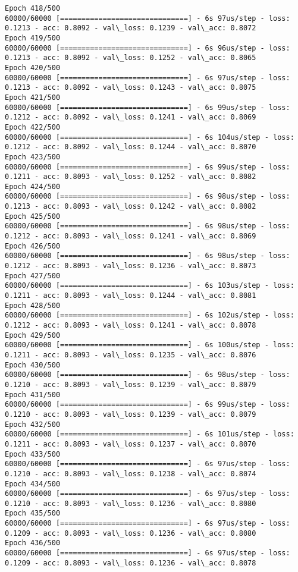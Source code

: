 \documentclass[11pt]{article}
\begin{document}
\begin{Verbatim}[commandchars=\\\{\}]
Epoch 418/500
60000/60000 [==============================] - 6s 97us/step - loss: 0.1213 - acc: 0.8092 - val\_loss: 0.1239 - val\_acc: 0.8072
Epoch 419/500
60000/60000 [==============================] - 6s 96us/step - loss: 0.1213 - acc: 0.8092 - val\_loss: 0.1252 - val\_acc: 0.8065
Epoch 420/500
60000/60000 [==============================] - 6s 97us/step - loss: 0.1213 - acc: 0.8092 - val\_loss: 0.1243 - val\_acc: 0.8075
Epoch 421/500
60000/60000 [==============================] - 6s 99us/step - loss: 0.1212 - acc: 0.8092 - val\_loss: 0.1241 - val\_acc: 0.8069
Epoch 422/500
60000/60000 [==============================] - 6s 104us/step - loss: 0.1212 - acc: 0.8092 - val\_loss: 0.1244 - val\_acc: 0.8070
Epoch 423/500
60000/60000 [==============================] - 6s 99us/step - loss: 0.1211 - acc: 0.8093 - val\_loss: 0.1252 - val\_acc: 0.8082
Epoch 424/500
60000/60000 [==============================] - 6s 98us/step - loss: 0.1213 - acc: 0.8093 - val\_loss: 0.1242 - val\_acc: 0.8082
Epoch 425/500
60000/60000 [==============================] - 6s 98us/step - loss: 0.1212 - acc: 0.8093 - val\_loss: 0.1241 - val\_acc: 0.8069
Epoch 426/500
60000/60000 [==============================] - 6s 98us/step - loss: 0.1212 - acc: 0.8093 - val\_loss: 0.1236 - val\_acc: 0.8073
Epoch 427/500
60000/60000 [==============================] - 6s 103us/step - loss: 0.1211 - acc: 0.8093 - val\_loss: 0.1244 - val\_acc: 0.8081
Epoch 428/500
60000/60000 [==============================] - 6s 102us/step - loss: 0.1212 - acc: 0.8093 - val\_loss: 0.1241 - val\_acc: 0.8078
Epoch 429/500
60000/60000 [==============================] - 6s 100us/step - loss: 0.1211 - acc: 0.8093 - val\_loss: 0.1235 - val\_acc: 0.8076
Epoch 430/500
60000/60000 [==============================] - 6s 98us/step - loss: 0.1210 - acc: 0.8093 - val\_loss: 0.1239 - val\_acc: 0.8079
Epoch 431/500
60000/60000 [==============================] - 6s 99us/step - loss: 0.1210 - acc: 0.8093 - val\_loss: 0.1239 - val\_acc: 0.8079
Epoch 432/500
60000/60000 [==============================] - 6s 101us/step - loss: 0.1211 - acc: 0.8093 - val\_loss: 0.1237 - val\_acc: 0.8070
Epoch 433/500
60000/60000 [==============================] - 6s 97us/step - loss: 0.1210 - acc: 0.8093 - val\_loss: 0.1238 - val\_acc: 0.8074
Epoch 434/500
60000/60000 [==============================] - 6s 97us/step - loss: 0.1210 - acc: 0.8093 - val\_loss: 0.1236 - val\_acc: 0.8080
Epoch 435/500
60000/60000 [==============================] - 6s 97us/step - loss: 0.1209 - acc: 0.8093 - val\_loss: 0.1236 - val\_acc: 0.8080
Epoch 436/500
60000/60000 [==============================] - 6s 97us/step - loss: 0.1209 - acc: 0.8093 - val\_loss: 0.1236 - val\_acc: 0.8078

\end{Verbatim}
\end{document}
